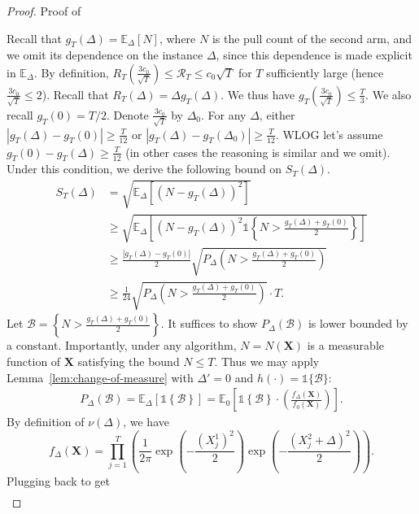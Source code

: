 \documentclass[nonblindrev]{informs3_noinforms}
\begin{document}
\begin{proof}{Proof of }

Recall that $g_T(\Delta) = \mathbb{E}_\Delta[N]$, where $N$ is the pull count of the second arm, and we omit its dependence on the instance $\Delta$, since this dependence is made explicit in $\mathbb{E}_\Delta$. By definition, $R_T\left(\frac{3c_0}{\sqrt{T}}\right) \le \mathcal{R}_T  \le c_0 \sqrt{T}$ for $T$ sufficiently large (hence $\frac{3c_0}{\sqrt{T}} \le 2$). Recall that $R_T(\Delta) = \Delta g_T(\Delta)$. We thus have $g_T\left(\frac{3c_0}{\sqrt{T}}\right) \le \frac{T}{3}$. We also recall $g_T(0) = T/2.$ Denote $\frac{3 c_0}{\sqrt{T}} $ by $\Delta_0.$ For any $\Delta$, either $|g_T(\Delta) - g_T(0)| \ge \frac{T}{12}$ or $|g_T(\Delta) - g_T(\Delta_0)| \ge \frac{T}{12}$. WLOG let's assume $g_T(0) - g_T(\Delta) \ge \frac{T}{12}$ (in other cases the reasoning is similar and we omit). Under this condition, we derive the following bound on $S_T(\Delta)$.
\begin{align*}
    S_T(\Delta)&=\sqrt{\mathbb E_{\Delta}[(N -g_T(\Delta))^2]}\\
    &\geq\sqrt{\mathbb E_{\Delta}\left[(N-g_T(\Delta))^2\mathds 1\left\{N >\frac{g_T(\Delta)+g_T(0)}{2}\right\}\right]}\\
    &\geq \frac{|g_T(\Delta)-g_T(0)|}{2}\sqrt{P_{\Delta}\left(N>\frac{g_T(\Delta)+g_T(0)}{2}\right)}\\
    &\ge \frac{1}{24}\sqrt{P_{\Delta}\left(N>\frac{g_T(\Delta)+g_T(0)}{2}\right)} \cdot  T.
\end{align*}
Let $\mathcal{B} = \left\{N>\frac{g_T(\Delta)+g_T(0)}{2}\right\}$.  It suffices to show $P_{\Delta}\left(\mathcal{B} \right)$ is lower bounded by a constant. Importantly, under any algorithm, $N = N(\mathbf{X})$ is a measurable function of $\mathbf{X}$ satisfying the bound $N \le T$. Thus we may apply Lemma~\ref{lem:change-of-measure} with $\Delta' = 0$ and $h(\cdot) = \mathds{1}\{\mathcal{B} \}$:
\begin{align*}
P_\Delta\left(\mathcal{B}\right) = \mathbb{E}_{\Delta}\left[\mathds{1}\left\{\mathcal{B}\right\}\right] = \mathbb{E}_{0}\left[\mathds{1}\left\{\mathcal{B}\right\}\cdot \left(\frac{f_{\Delta}(\mathbf{X})}{f_{0}(\mathbf{X})}\right)\right].
\end{align*}
By definition of $\nu(\Delta)$, we have
\[
f_{\Delta}(\mathbf{X}) = \prod_{j = 1}^T \left(\frac{1}{2\pi}\exp\left(-\frac{(X^1_j)^2}{2}\right)\exp\left(-\frac{(X^2_j + \Delta)^2}{2}\right)\right).
\]
Plugging back to get
\begin{align*}

\end{align*}
\end{proof}
\end{document}
